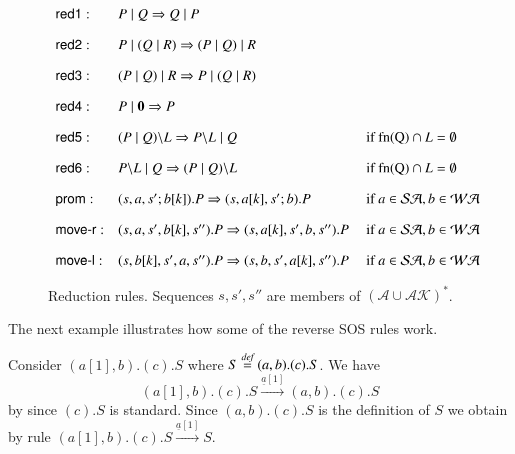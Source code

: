 \begin{figure}[t] 
\[
\begin{array}{lll}
\textsf{red1}: & P\mid Q \Rightarrow Q\mid P& 
\\[10pt]
\textsf{red2}: & P\mid (Q\mid R) \Rightarrow (P\mid Q)\mid R &
\\[10pt]
\textsf{red3}: & (P\mid Q)\mid R \Rightarrow P\mid (Q\mid R) & 
\\[10pt]
\textsf{red4}: & P\mid \mathbf{0} \Rightarrow P & 
\\[10pt]
\textsf{red5}: & (P\; \vert \; Q)\backslash L \Rightarrow P\backslash L \; \vert \; Q & \mbox{ if fn(Q)} \cap L = \emptyset
\\[10pt]
\textsf{red6}: & P\backslash L \; \vert \; Q \Rightarrow (P\; \vert \; Q)\backslash L & \mbox{ if fn(Q)} \cap L = \emptyset
\\[10pt]
\textsf{prom}: & (s,a,s';b[k]).P \Rightarrow (s,a[k],s';b).P & \mbox{ if } a \in \mathcal{SA}, b \in \mathcal{WA} 
\\[10pt]
\textsf{move-r}: & (s,a,s',b[k],s'').P \Rightarrow (s,a[k],s',b,s'').P & \mbox{ if } a \in \mathcal{SA}, b \in \mathcal{WA}
\\[10pt]
\textsf{move-l}: & (s,b[k],s',a,s'').P \Rightarrow (s,b,s',a[k],s'').P & \mbox{ if } a \in \mathcal{SA}, b \in \mathcal{WA}
\end{array}
\] 
\caption{Reduction rules. Sequences $s, s', s''$ are members of $(\mathcal{A} \cup \mathcal{AK})^{*}$.} 
\label{fig:reduction}
\end{figure}

The next example illustrates how some of the reverse SOS rules work.
\begin{example}
{\rm 
Consider $(a[1],b).(c).S$ where $S\stackrel{\emph{def}}{=} (a,b).(c).S$. We have 
$$(a[1],b).(c).S \xrightarrow{\underline{a}[1]} (a,b).(c).S$$ by  since $(c).S$ is standard.
Since $(a,b).(c).S$ is the definition of $S$ we obtain by rule  $(a[1],b).(c).S \xrightarrow{\underline{a}[1]} S$.
}
\end{example}

